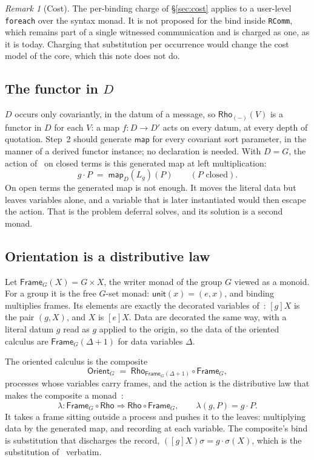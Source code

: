 \documentclass[11pt]{article}
\theoremstyle{definition}
\theoremstyle{plain}
\theoremstyle{remark}
\newtheorem{remark}[definition]{Remark}
\newcommand{\unit}{\mathsf{unit}}
\newcommand{\fmap}{\mathsf{map}}
\newcommand{\fe}{\texttt{foreach}}
\begin{document}
\begin{remark}[Cost]
The per-binding charge of \S\ref{sec:cost} applies to a user-level \fe{} over
the syntax monad. It is not proposed for the bind inside \texttt{RComm}, which
remains part of a single witnessed communication and is charged as one, as it
is today. Charging that substitution per occurrence would change the cost model
of the core, which this note does not do.
\end{remark}

\subsection{The functor in \texorpdfstring{\(D\)}{D}}

\(D\) occurs only covariantly, in the datum of a message, so
\(\mathsf{Rho}_{(-)}(V)\) is a functor in \(D\) for each \(V\): a map
\(f : D\to D'\) acts on every datum, at every depth of quotation. Step~2 should
generate \(\fmap\) for every covariant sort parameter, in the manner of a
derived functor instance; no declaration is needed. With \(D=G\), the action
of~\cite{Oriented} on closed terms is this generated map at left
multiplication:
\[
g\cdot P \;=\; \fmap_D(L_g)(P) \qquad (P \text{ closed}).
\]
On open terms the generated map is not enough. It moves the literal data but
leaves variables alone, and a variable that is later instantiated would then
escape the action. That is the problem deferral solves, and its solution is a
second monad.

\subsection{Orientation is a distributive law}

Let \(\mathsf{Frame}_G(X) = G\times X\), the writer monad of the group \(G\)
viewed as a monoid. For a group it is the free \(G\)-set monad: \(\unit(x) =
(e, x)\), and binding multiplies frames. Its elements are exactly the decorated
variables of~\cite{Oriented}: \([g]X\) is the pair \((g, X)\), and \(X\) is
\([e]X\). Data are decorated the same way, with a literal datum \(g\) read as
\(g\) applied to the origin, so the data of the oriented calculus are
\(\mathsf{Frame}_G(\Delta + 1)\) for data variables \(\Delta\).

The oriented calculus is the composite
\[
\mathsf{Orient}_G \;=\; \mathsf{Rho}_{\mathsf{Frame}_G(\Delta+1)} \circ \mathsf{Frame}_G ,
\]
processes whose variables carry frames, and the action is the distributive
law that makes the composite a monad~\cite{Beck69}:
\[
\lambda : \mathsf{Frame}_G\circ\mathsf{Rho} \Rightarrow
\mathsf{Rho}\circ\mathsf{Frame}_G,
\qquad
\lambda(g, P) = g\cdot P .
\]
It takes a frame sitting outside a process and pushes it to the leaves:
multiplying data by the generated map, and recording at each variable. The
composite's bind is substitution that discharges the record,
\(([g]X)\sigma = g\cdot\sigma(X)\), which is the substitution
of~\cite{Oriented} verbatim.
\end{document}
